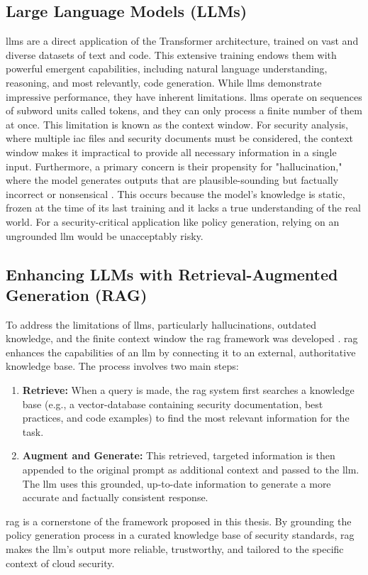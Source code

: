 \subsection{Large Language Models (LLMs)}
\glspl{llm} are a direct application of the Transformer architecture, trained on vast and diverse datasets of text and code. This extensive training endows them with powerful emergent capabilities, including natural language understanding, reasoning, and most relevantly, code generation. While \glspl{llm} demonstrate impressive performance, they have inherent limitations. \glspl{llm} operate on sequences of subword units called tokens, and they can only process a finite number of them at once. This limitation is known as the context window. For security analysis, where multiple \gls{iac} files and security documents must be considered, the context window makes it impractical to provide all necessary information in a single input. Furthermore, a primary concern is their propensity for "hallucination," where the model generates outputs that are plausible-sounding but factually incorrect or nonsensical \cite{haque_sok_2025}. This occurs because the model's knowledge is static, frozen at the time of its last training and it lacks a true understanding of the real world. For a security-critical application like policy generation, relying on an ungrounded \gls{llm} would be unacceptably risky.

\subsection{Enhancing LLMs with Retrieval-Augmented Generation (RAG)}
To address the limitations of \glspl{llm}, particularly hallucinations, outdated knowledge, and the finite context window the \gls{rag} framework was developed \cite{lewis_retrieval-augmented_2020}. \gls{rag} enhances the capabilities of an \gls{llm} by connecting it to an external, authoritative knowledge base. The process involves two main steps:
\begin{enumerate}
    \item \textbf{Retrieve:} When a query is made, the \gls{rag} system first searches a knowledge base (e.g., a \gls{vector-database} containing security documentation, best practices, and code examples) to find the most relevant information for the task.
    \item \textbf{Augment and Generate:} This retrieved, targeted information is then appended to the original prompt as additional context and passed to the \gls{llm}. The \gls{llm} uses this grounded, up-to-date information to generate a more accurate and factually consistent response.
\end{enumerate}
\gls{rag} is a cornerstone of the framework proposed in this thesis. By grounding the policy generation process in a curated knowledge base of security standards, \gls{rag} makes the \gls{llm}'s output more reliable, trustworthy, and tailored to the specific context of cloud security.

